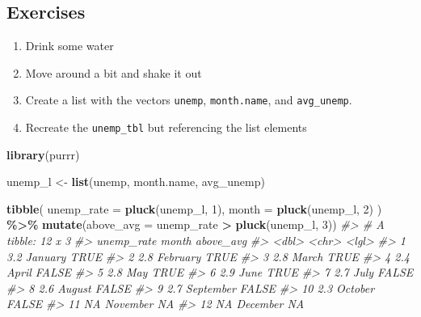 \documentclass[
]{book}
\newenvironment{Shaded}{\begin{snugshade}}{\end{snugshade}}
\newcommand{\CommentTok}[1]{\textcolor[rgb]{0.56,0.35,0.01}{\textit{#1}}}
\newcommand{\DataTypeTok}[1]{\textcolor[rgb]{0.13,0.29,0.53}{#1}}
\newcommand{\DecValTok}[1]{\textcolor[rgb]{0.00,0.00,0.81}{#1}}
\newcommand{\KeywordTok}[1]{\textcolor[rgb]{0.13,0.29,0.53}{\textbf{#1}}}
\newcommand{\NormalTok}[1]{#1}
\newcommand{\OperatorTok}[1]{\textcolor[rgb]{0.81,0.36,0.00}{\textbf{#1}}}
\newcommand{\StringTok}[1]{\textcolor[rgb]{0.31,0.60,0.02}{#1}}
\providecommand{\tightlist}{%
  \setlength{\itemsep}{0pt}\setlength{\parskip}{0pt}}
\begin{document}
\hypertarget{exercises}{%
\subsection{Exercises}\label{exercises}}

\begin{enumerate}
\def\labelenumi{\arabic{enumi}.}
\tightlist
\item
  Drink some water
\item
  Move around a bit and shake it out
\item
  Create a list with the vectors \texttt{unemp}, \texttt{month.name}, and \texttt{avg\_unemp}.
\item
  Recreate the \texttt{unemp\_tbl} but referencing the list elements
\end{enumerate}

\begin{Shaded}
\begin{Highlighting}[]
\KeywordTok{library}\NormalTok{(purrr)}

\NormalTok{unemp\_l \textless{}{-}}\StringTok{ }\KeywordTok{list}\NormalTok{(unemp, month.name, avg\_unemp)}

\KeywordTok{tibble}\NormalTok{(}
  \DataTypeTok{unemp\_rate =} \KeywordTok{pluck}\NormalTok{(unemp\_l, }\DecValTok{1}\NormalTok{),}
  \DataTypeTok{month =} \KeywordTok{pluck}\NormalTok{(unemp\_l, }\DecValTok{2}\NormalTok{)}
\NormalTok{) }\OperatorTok{\%\textgreater{}\%}\StringTok{ }
\StringTok{  }\KeywordTok{mutate}\NormalTok{(}\DataTypeTok{above\_avg =}\NormalTok{ unemp\_rate }\OperatorTok{\textgreater{}}\StringTok{ }\KeywordTok{pluck}\NormalTok{(unemp\_l, }\DecValTok{3}\NormalTok{))}
\CommentTok{\#\textgreater{} \# A tibble: 12 x 3}
\CommentTok{\#\textgreater{}    unemp\_rate month     above\_avg}
\CommentTok{\#\textgreater{}         \textless{}dbl\textgreater{} \textless{}chr\textgreater{}     \textless{}lgl\textgreater{}    }
\CommentTok{\#\textgreater{}  1        3.2 January   TRUE     }
\CommentTok{\#\textgreater{}  2        2.8 February  TRUE     }
\CommentTok{\#\textgreater{}  3        2.8 March     TRUE     }
\CommentTok{\#\textgreater{}  4        2.4 April     FALSE    }
\CommentTok{\#\textgreater{}  5        2.8 May       TRUE     }
\CommentTok{\#\textgreater{}  6        2.9 June      TRUE     }
\CommentTok{\#\textgreater{}  7        2.7 July      FALSE    }
\CommentTok{\#\textgreater{}  8        2.6 August    FALSE    }
\CommentTok{\#\textgreater{}  9        2.7 September FALSE    }
\CommentTok{\#\textgreater{} 10        2.3 October   FALSE    }
\CommentTok{\#\textgreater{} 11       NA   November  NA       }
\CommentTok{\#\textgreater{} 12       NA   December  NA}
\end{Highlighting}
\end{Shaded}
\end{document}
